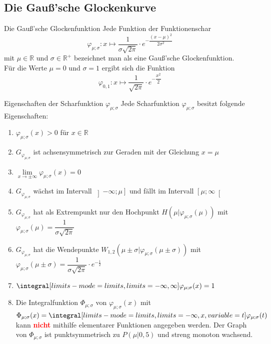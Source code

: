     \subsection{Die Gauß'sche Glockenkurve}
    \begin{defi}{Die Gauß'sche Glockenfunktion}{}
        Jede Funktion der Funktionenschar \[\varphi_{\mu;\sigma} : x\mapsto \dfrac{1}{\sigma \sqrt{2\pi}} \cdot e^{-\dfrac{\left(x-\mu\right)^2}{2\sigma^2}}\] mit \(\mu \in \mathds{R}\) und \(\sigma \in \mathds{R}^+\) bezeichnet man als eine Gauß'sche Glockenfunktion.\\
        Für die Werte \(\mu =0\) und \(\sigma =1\) ergibt sich die Funktion \[\varphi_{0,1}: x \mapsto \dfrac{1}{\sqrt{2\pi}} \cdot e^{-\dfrac{x^2}{2}}\]
    \end{defi}
    \begin{satz}{Eigenschaften der Scharfunktion \(\varphi_{\mu;\sigma}\)}{}\label{EigenschaftGauss}
        Jede Scharfunktion \(\varphi_{\mu;\sigma}\) besitzt folgende Eigenschaften:
        \begin{enumerate}
            \item \(\varphi_{\mu;\sigma}(x) > 0\) für \( x\in \mathds{R}\)
            \item \(G_{\varphi_{\mu;\sigma}}\) ist achsensymmetrisch zur Geraden mit der Gleichung \(x= \mu\)
            \item \(\lim\limits_{x \longrightarrow \pm \infty}\varphi_{\mu;\sigma}(x) =0\)
            \item \(G_{\varphi_{\mu;\sigma}}\) wächst im Intervall \(\left] -\infty; \mu \right]\) und fällt im Intervall \(\left[ \mu; \infty \right[\) 
            \item \label{NormExtrem}\(G_{\varphi_{\mu;\sigma}}\) hat als Extrempunkt nur den Hochpunkt \(H(\mu |\varphi_{\mu;\sigma}(\mu))\) mit \(\varphi_{\mu;\sigma}(\mu) = \dfrac{1}{\sigma \sqrt{2\pi}}\)
            \item \label{WendeNorm}\(G_{\varphi_{\mu;\sigma}}\) hat die Wendepunkte \(W_{1,2} (\mu \pm \sigma|\varphi_{\mu;\sigma}(\mu \pm \sigma))\) mit \( \varphi_{\mu;\sigma}(\mu \pm \sigma) = \dfrac{1}{\sigma\sqrt{2\pi}}\cdot e^{-\frac{1}{2}}\)
            \item \(\integral[limits-mode=limits,limits={-\infty, \infty}]{\varphi_{\mu;\sigma}(x)} =1\)
            \item Die Integralfunktion \(\Phi_{\mu;\sigma}\) von \(\varphi_{\mu;\sigma}(x)\) mit \(\Phi_{\mu;\sigma}(x) = \integral[limits-mode=limits,limits={-\infty, x}, variable={t}]{\varphi_{\mu;\sigma}(t)}\) kann \textcolor{red}{\textbf{nicht}} mithilfe elementarer Funktionen angegeben werden. Der Graph von \(\Phi_{\mu;\sigma}\) ist punktsymmetrisch zu \(P(\mu|0,5)\) und streng monoton wachsend.
        \end{enumerate}    
        \end{satz}

